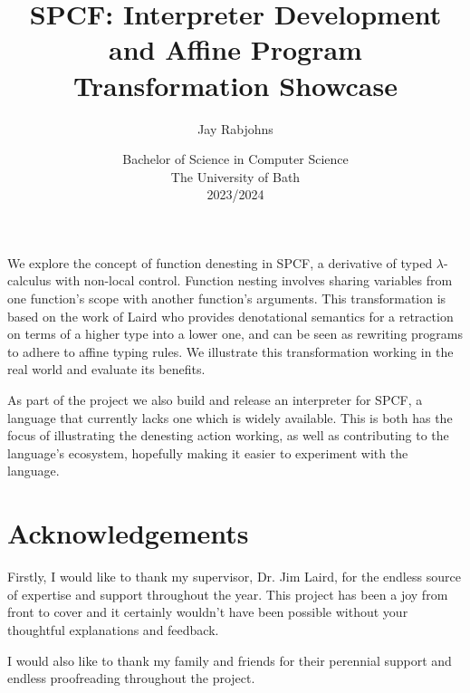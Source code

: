 \documentclass[12pt,a4paper]{report}
\title{SPCF: Interpreter Development and Affine Program Transformation Showcase}
\author{Jay Rabjohns}
\date{Bachelor of Science in Computer Science\\ 
      The University of Bath\\
      2023/2024}
\theoremstyle{definition}
\theoremstyle{definition}
\theoremstyle{remark}
\begin{document}
\hypersetup{pageanchor=false}

\lstset{language=Haskell,breaklines,breakatwhitespace,basicstyle=\small}

\setcounter{page}{0}

\maketitle
\newpage

\newpage

\hypersetup{pageanchor=true}
\abstract

We explore the concept of function denesting in SPCF, a derivative of typed $\lambda$-calculus with non-local control. Function nesting involves sharing variables from one function’s scope with another function's arguments. This transformation is based on the work of Laird who provides denotational semantics for a retraction on terms of a higher type into a lower one, and can be seen as rewriting programs to adhere to affine typing rules. We illustrate this transformation working in the real world and evaluate its benefits. 

As part of the project we also build and release an interpreter for SPCF, a language that currently lacks one which is widely available. This is both has the focus of illustrating the denesting action working, as well as contributing to the language’s ecosystem, hopefully making it easier to experiment with the language.
\newpage

\tableofcontents
\newpage

\listoffigures
\newpage

\listoftables
\newpage

\chapter*{Acknowledgements}
Firstly, I would like to thank my supervisor, Dr. Jim Laird, for the endless source of expertise and support throughout the year. This project has been a joy from front to cover and it certainly wouldn't have been possible without your thoughtful explanations and feedback.

I would also like to thank my family and friends for their perennial support and endless proofreading throughout the project.
\end{document}
